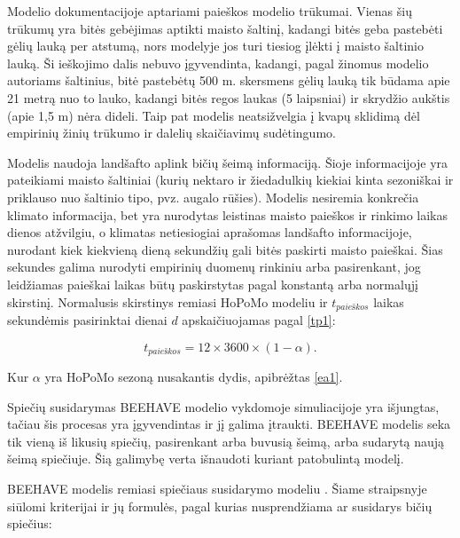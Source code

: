\documentclass{VUMIFKompMagistrinis}
\begin{document}
Modelio dokumentacijoje aptariami paieškos modelio trūkumai. Vienas šių trūkumų yra bitės gebėjimas aptikti maisto šaltinį, kadangi bitės geba pastebėti gėlių lauką per atstumą, nors modelyje jos turi tiesiog įlėkti į maisto šaltinio lauką. Ši ieškojimo dalis nebuvo įgyvendinta, kadangi, pagal žinomus modelio autoriams šaltinius, bitė pastebėtų 500 m. skersmens gėlių lauką tik būdama apie 21 metrą nuo to lauko, kadangi bitės regos laukas (5 laipsniai) ir skrydžio aukštis (apie 1,5 m) nėra dideli. Taip pat modelis neatsižvelgia į kvapų sklidimą dėl empirinių žinių trūkumo ir dalelių skaičiavimų sudėtingumo.






Modelis naudoja landšafto aplink bičių šeimą informaciją. Šioje informacijoje yra pateikiami maisto šaltiniai (kurių nektaro ir žiedadulkių kiekiai kinta sezoniškai ir priklauso nuo šaltinio tipo, pvz. augalo rūšies).
Modelis nesiremia konkrečia klimato informacija, bet yra nurodytas leistinas maisto paieškos ir rinkimo laikas dienos atžvilgiu, o klimatas netiesiogiai aprašomas landšafto informacijoje, nurodant kiek kiekvieną dieną sekundžių gali bitės paskirti maisto paieškai. Šias sekundes galima nurodyti empirinių duomenų rinkiniu arba pasirenkant, jog leidžiamas paieškai laikas būtų paskirstytas pagal konstantą arba normalųjį skirstinį. Normalusis skirstinys remiasi HoPoMo modeliu ir $t_{paie\textit{\v{s}}kos}$ laikas sekundėmis pasirinktai dienai $d$ apskaičiuojamas pagal \eqref{tp1}:
\newpage

\begin{equation}\label{tp1}
t_{paie\textit{\v{s}}kos}= 12×3600×(1-\alpha).
\end{equation}

Kur $\alpha$ yra HoPoMo sezoną nusakantis dydis, apibrėžtas \eqref{ea1}.



Spiečių susidarymas BEEHAVE modelio vykdomoje simuliacijoje yra išjungtas, tačiau šis procesas yra įgyvendintas ir jį galima įtraukti. BEEHAVE modelis seka tik vieną iš likusių spiečių, pasirenkant arba buvusią šeimą, arba sudarytą naują šeimą spiečiuje. Šią galimybę verta išnaudoti kuriant patobulintą modelį.

BEEHAVE modelis remiasi spiečiaus susidarymo modeliu \cite{FeS06}. Šiame straipsnyje siūlomi kriterijai ir jų formulės, pagal kurias nusprendžiama ar susidarys bičių spiečius:
\end{document}
